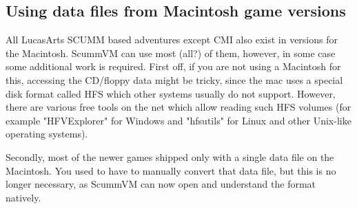 \subsection {Using data files from Macintosh game versions}
All LucasArts SCUMM based adventures except CMI also exist in versions for the
Macintosh. ScummVM can use most (all?) of them, however, in some case some
additional work is required. First off, if you are not using a Macintosh for
this, accessing the CD/floppy data might be tricky, since the mac uses a 
special disk format called HFS which other systems usually do not support.
However, there are various free tools on the net which allow reading such HFS
volumes (for example "HFVExplorer" for Windows and "hfsutils" for Linux and
other Unix-like operating systems).

Secondly, most of the newer games shipped only with a  single data file on the
Macintosh. You used to have to manually convert that data file, but this is no
longer necessary, as ScummVM can now open and understand the format natively.
